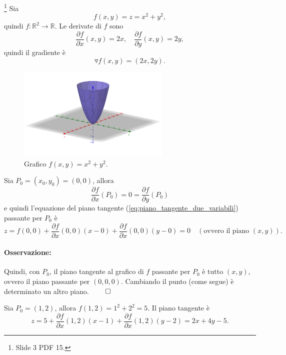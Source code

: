 \begin{example}\footnote{Slide 3 PDF 15.}
	Sia
	\begin{equation*}
		f(x,y)=z=x^2+y^2,
	\end{equation*}
	quindi $f:\mathbb{R}^2\rightarrow\mathbb{R}$. Le derivate di $f$ sono
	\begin{equation*}
		\frac{\partial f}{\partial x}(x,y) = 2x,\quad \frac{\partial f}{\partial y} (x,y) = 2y,
	\end{equation*}	
	quindi il gradiente è
	\begin{equation*}
		\triangledown f(x,y)=(2x,2y).
	\end{equation*}
	
	\begin{figure}[ht]
		\centering
		\includegraphics[width=0.65\textwidth]{Analisi2/figures/esercizio_piano_tangente.png}
		\caption{Grafico $f(x,y)=x^2+y^2$.}\label{fig:esercizio_piano_tangente}
	\end{figure}
	
	\noindent Sia $P_0=(x_0,y_0)=(0,0)$, allora
	\begin{equation*}
		\frac{\partial f}{\partial x}(P_0) = 0= \frac{\partial f}{\partial y} (P_0)
	\end{equation*}
	e quindi l'equazione del piano tangente (\ref{eq:piano_tangente_due_variabili}) passante per $P_0$ è
	\begin{equation*}
		z=f(0,0) + \frac{\partial f}{\partial x} (0,0) (x-0) + \frac{\partial f}{\partial x} (0,0) (y-0) = 0\quad (\text{ovvero il piano }(x,y)).
	\end{equation*}
	
	\paragraph{Osservazione:} Quindi, con $P_0$, il piano tangente al grafico di $f$ passante per $P_0$ è tutto $(x,y)$, ovvero il piano passante per $(0,0,0)$. Cambiando il punto (come segue) è determinato un altro piano. $\qed$
	
	\noindent Sia $P_0=(1,2)$, allora $f(1,2)=1^2+2^2=5$. Il piano tangente è
	\begin{equation*}
		z=5 + \frac{\partial f}{\partial x} (1,2) (x-1) + \frac{\partial f}{\partial x} (1,2) (y-2) = 2x + 4y - 5.
	\end{equation*}
	
\end{example}

